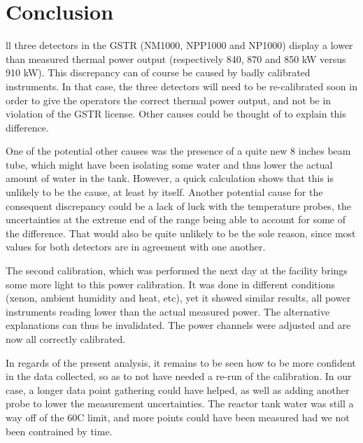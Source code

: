 %
%
\let\textcircled=\pgftextcircled
\chapter{Conclusion}
\label{chap:conclusion}

ll three detectors in the GSTR (NM1000, NPP1000 and NP1000) display a lower than measured thermal power output (respectively 840, 870 and 850 kW versus 910 kW). This discrepancy can of course be caused by badly calibrated instruments. In that case, the three detectors will need to be re-calibrated soon in order to give the operators the correct thermal power output, and not be in violation of the GSTR license. Other causes could be thought of to explain this difference.

One of the potential other causes was the presence of a quite new 8 inches beam tube, which might have been isolating some water and thus lower the actual amount of water in the tank. However, a quick calculation shows that this is unlikely to be the cause, at least by itself. Another potential cause for the consequent discrepancy could be a lack of luck with the temperature probes, the uncertainties at the extreme end of the range being able to account for some of the difference. That would also be quite unlikely to be the sole reason, since most values for both detectors are in agreement with one another.

The second calibration, which was performed the next day at the facility brings some more light to this power calibration. It was done in different conditions (xenon, ambient humidity and heat, etc), yet it showed similar results, all power instruments reading lower than the actual measured power. The alternative explanations can thus be invalidated. The power channels were adjusted and are now all correctly calibrated.

In regards of the present analysis, it remains to be seen how to be more confident in the data collected, so as to not have needed a re-run of the calibration. In our case, a longer data point gathering could have helped, as well as adding another probe to lower the measurement uncertainties. The reactor tank water was still a way off of the 60\degree C limit, and more points could have been measured had we not been contrained by time.



